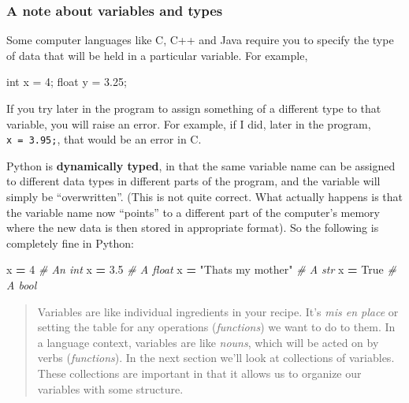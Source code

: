 \documentclass[
  letterpaper,
]{scrbook}
\newenvironment{Shaded}{\begin{snugshade}}{\end{snugshade}}
\newcommand{\CommentTok}[1]{\textcolor[rgb]{0.56,0.35,0.01}{\textit{#1}}}
\newcommand{\DataTypeTok}[1]{\textcolor[rgb]{0.13,0.29,0.53}{#1}}
\newcommand{\DecValTok}[1]{\textcolor[rgb]{0.00,0.00,0.81}{#1}}
\newcommand{\FloatTok}[1]{\textcolor[rgb]{0.00,0.00,0.81}{#1}}
\newcommand{\NormalTok}[1]{#1}
\newcommand{\OperatorTok}[1]{\textcolor[rgb]{0.81,0.36,0.00}{\textbf{#1}}}
\newcommand{\StringTok}[1]{\textcolor[rgb]{0.31,0.60,0.02}{#1}}
\newcommand{\VariableTok}[1]{\textcolor[rgb]{0.00,0.00,0.00}{#1}}
\begin{document}
\hypertarget{a-note-about-variables-and-types}{%
\subsubsection{A note about variables and types}\label{a-note-about-variables-and-types}}

Some computer languages like C, C++ and Java require you to specify the type of data that will be held in a particular variable. For example,

\begin{Shaded}
\begin{Highlighting}[]
\DataTypeTok{int}\NormalTok{ x = }\DecValTok{4}\NormalTok{;}
\DataTypeTok{float}\NormalTok{ y = }\FloatTok{3.25}\NormalTok{;}
\end{Highlighting}
\end{Shaded}

If you try later in the program to assign something of a different type to that variable, you will raise an error. For example, if I did, later in the program, \texttt{x\ =\ 3.95;}, that would be an error in C.

Python is \textbf{dynamically typed}, in that the same variable name can be assigned to different data types in different parts of the program, and the variable will simply be ``overwritten''. (This is not quite correct. What actually happens is that the variable name now ``points'' to a different part of the computer's memory where the new data is then stored in appropriate format). So the following is completely fine in Python:

\begin{Shaded}
\begin{Highlighting}[]
\NormalTok{x }\OperatorTok{=} \DecValTok{4}  \CommentTok{\# An int}
\NormalTok{x }\OperatorTok{=} \FloatTok{3.5}  \CommentTok{\# A float}
\NormalTok{x }\OperatorTok{=} \StringTok{"That\textquotesingle{}s my mother"}  \CommentTok{\# A str}
\NormalTok{x }\OperatorTok{=} \VariableTok{True}  \CommentTok{\# A bool}
\end{Highlighting}
\end{Shaded}

\begin{quote}
Variables are like individual ingredients in your recipe. It's \emph{mis en place} or setting the table for any operations (\emph{functions}) we want to do to them. In a language context, variables are like \emph{nouns}, which will be acted on by verbs (\emph{functions}). In the next section we'll look at collections of variables. These collections are important in that it allows us to organize our variables with some structure.
\end{quote}
\end{document}
